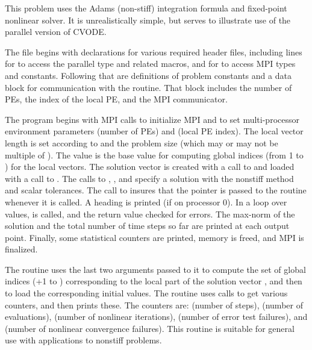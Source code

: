 This problem uses the Adams (non-stiff) integration formula and fixed-point
nonlinear solver.  It is unrealistically simple, but serves to illustrate
use of the parallel version of CVODE.

The  file begins with  declarations for
various required header files, including lines for
 to access the parallel  type and related
macros, and for  to access MPI types and constants. Following
that are definitions of problem constants and a data block for communication
with the  routine.  That block includes the number of PEs, the index
of the local PE, and the MPI communicator.

The  program begins with MPI calls to initialize MPI and to set
multi-processor environment parameters  (number of PEs) and
 (local PE index).  The local vector length is set according
to  and the problem size  (which may or may not be
multiple of ).  The value  is the base value for
computing global indices (from 1 to ) for the local vectors.
The solution vector  is created with a call to 
and loaded with a call to .  The calls to ,
, and  specify a {\cvode} solution with
the nonstiff method and scalar tolerances.  The call to 
insures that the pointer  is passed to the  routine whenever it
is called.
A heading is printed (if on processor 0).  In a loop over  values,
 is called, and the return value checked for errors.  The
max-norm of the solution and the total number of time steps so far
are printed at each output point.  Finally, some statistical counters are
printed, memory is freed, and MPI is finalized.

The  routine uses the last two arguments passed to it to compute
the set of global indices (+1 to )
corresponding to the local part of the solution vector , and then to
load the corresponding initial values.  The  routine
uses  calls to get various counters, and then prints these.
The counters are:  (number of steps),  (number of
 evaluations),  (number of nonlinear iterations),
 (number of error test failures), and  (number of
nonlinear convergence failures).  This routine is suitable for general use
with {\cvode} applications to nonstiff problems.

